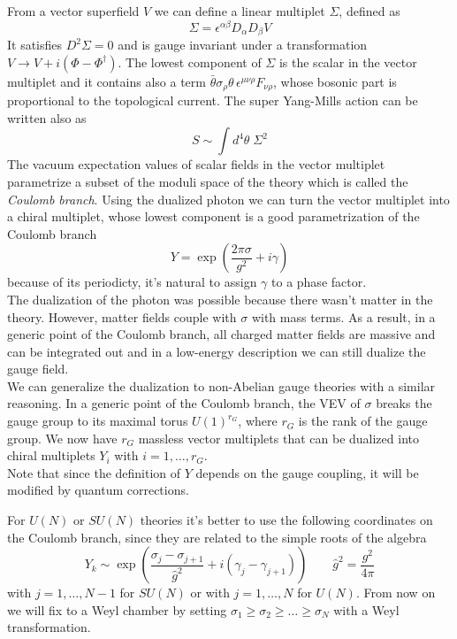 From a vector superfield $V$ we can define a linear multiplet $\Sigma$, defined as
\begin{equation}
 \Sigma = \epsilon^{\alpha \beta} D_{\alpha} D_{\beta} V
\end{equation}
It satisfies $D^2 \Sigma = 0$ and is gauge invariant under a transformation $V \rightarrow V + i (\Phi - \Phi^{\dagger})$.
The lowest component of $\Sigma$ is the scalar in the vector multiplet and it contains also a term $ \bar{\theta} \sigma_{\rho} \theta \, \epsilon^{\mu \nu \rho} F_{\nu \rho}$, whose bosonic part is proportional to the topological current.
The super Yang-Mills action can be written also as
\begin{equation}
S \sim \int d^4 \theta \; \Sigma^2
\end{equation}
The  vacuum expectation values of scalar fields in the vector multiplet parametrize a subset of the moduli space of the theory which is called the \emph{Coulomb branch}.
Using the dualized photon we can turn the vector multiplet into a chiral multiplet, whose lowest component is a good parametrization of the Coulomb branch 
\begin{equation}
 Y = \exp{ \left( \frac{2 \pi \sigma}{g^2} + i \gamma \right)}
\end{equation}
because of its periodicty, it's natural to assign $\gamma$ to a phase factor.\\
The dualization of the photon was possible because there wasn't matter in the theory.
However, matter fields couple with $\sigma$ with mass terms. As a result, in a generic point of the Coulomb branch, all charged matter fields are massive and can be integrated out and in a low-energy description we can still dualize the gauge field.\\
We can generalize the dualization to non-Abelian gauge theories with a similar reasoning.
In a generic point of the Coulomb branch, the VEV of $\sigma$ breaks the gauge group to its maximal torus $U(1)^{r_G}$, where $r_G$ is the rank of the gauge group. 
We now have $r_G$ massless vector multiplets that can be dualized into chiral multiplets $Y_i$ with $i=1,\dotsc,r_G$.
\\
Note that since the definition of $Y$ depends on the gauge coupling, it will be modified by quantum corrections.

For $U(N)$ or $ SU(N)$ theories it's better to use the following coordinates on the Coulomb branch, since they are related to the simple roots of the algebra
\begin{equation}
 Y_k \sim \exp \left( \frac{\sigma_j- \sigma_{j+1}}{\hat{g}^2} + i ( \gamma_j - \gamma_{j+1} )   \right) \qquad \hat{g}^2 =  \frac{g^2}{4 \pi}
\label{eqn:Y_def_sun_theories}
\end{equation}
with $j = 1, \dotsc , N -1$ for $SU(N)$ or with $ j = 1, \dotsc, N$ for $U(N)$.
From now on we will fix to a Weyl chamber by setting $\sigma_1 \geq \sigma_2 \geq \dots \geq \sigma_N$ with a Weyl transformation.

